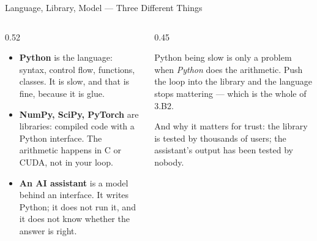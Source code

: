 \begin{frame}{Language, Library, Model --- Three Different Things}
\begin{columns}[T]
\begin{column}{0.52\textwidth}
\small
\begin{itemize}\footnotesize
  \item \textbf{Python} is the language: syntax, control flow, functions, classes. It is slow, and that is fine, because it is glue.
  \item \textbf{NumPy, SciPy, PyTorch} are libraries: compiled code with a Python interface. The arithmetic happens in C or CUDA, not in your loop.
  \item \textbf{An AI assistant} is a model behind an interface. It writes Python; it does not run it, and it does not know whether the answer is right.
\end{itemize}
\end{column}
\begin{column}{0.45\textwidth}
\begin{takeawaybox}[title=\textbf{Why this matters for speed}]\small
Python being slow is only a problem when \emph{Python} does the arithmetic. Push the loop into the library and the language stops mattering --- which is the whole of 3.B2.
\end{takeawaybox}
\medskip
\begin{examplebox}\footnotesize
And why it matters for trust: the library is tested by thousands of users; the assistant's output has been tested by nobody.
\end{examplebox}
\end{column}
\end{columns}
\vspace{1mm}
\end{frame}

